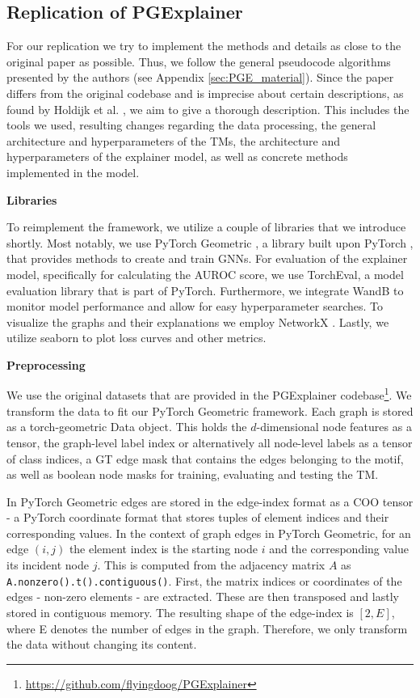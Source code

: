 \subsection{Replication of PGExplainer}
\label{sec:Replication_of_PGExplainer}

For our replication we try to implement the methods and details as close to the original paper as possible. Thus, we follow the general pseudocode algorithms presented by the authors (see Appendix \ref{sec:PGE_material}). Since the paper differs from the original codebase and is imprecise about certain descriptions, as found by Holdijk et al. \cite{holdijk2021re}, we aim to give a thorough description. This includes the tools we used, resulting changes regarding the data processing, the general architecture and hyperparameters of the \acp{TM}, the architecture and hyperparameters of the explainer model, as well as concrete methods implemented in the model. \bigskip

\textbf{Libraries}\par
 To reimplement the framework, we utilize a couple of libraries that we introduce shortly. Most notably, we use PyTorch Geometric \cite{Fey/Lenssen/2019}, a library built upon PyTorch \cite{paszke2019pytorch}, that provides methods to create and train GNNs. For evaluation of the explainer model, specifically for calculating the AUROC score, we use TorchEval, a model evaluation library that is part of PyTorch. Furthermore, we integrate WandB \cite{wandb} to monitor model performance and allow for easy hyperparameter searches. To visualize the graphs and their explanations we employ NetworkX \cite{SciPyProceedings_11}. Lastly, we utilize seaborn \cite{Waskom2021} to plot loss curves and other metrics.\bigskip

\textbf{Preprocessing}\par
We use the original datasets that are provided in the PGExplainer codebase\footnote{\url{https://github.com/flyingdoog/PGExplainer}}. We transform the data to fit our PyTorch Geometric framework. Each graph is stored as a torch-geometric Data object. This holds the $d$-dimensional node features as a tensor, the graph-level label index or alternatively all node-level labels as a tensor of class indices, a \ac{GT} edge mask that contains the edges belonging to the motif, as well as boolean node masks for training, evaluating and testing the \ac{TM}. 
 
In PyTorch Geometric edges are stored in the edge-index format as a COO tensor - a PyTorch coordinate format that stores tuples of element indices and their corresponding values. In the context of graph edges in PyTorch Geometric, for an edge $(i,j)$ the element index is the starting node $i$ and the corresponding value its incident node $j$. This is computed from the adjacency matrix $A$ as \lstinline|A.nonzero().t().contiguous()|.
First, the matrix indices or coordinates of the edges - non-zero elements - are extracted. These are then transposed and lastly stored in contiguous memory. The resulting shape of the edge-index is $[2, E]$, where E denotes the number of edges in the graph. Therefore, we only transform the data without changing its content. \bigskip

